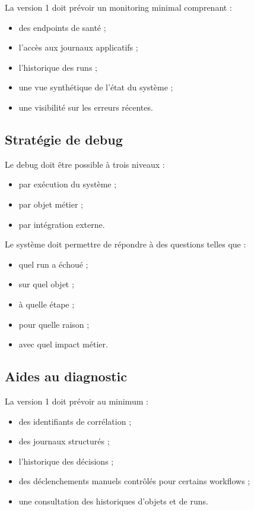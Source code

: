 \documentclass[11pt,a4paper]{article}
\begin{document}
La version 1 doit prévoir un monitoring minimal comprenant :

\begin{itemize}
    \item des endpoints de santé ;
    \item l’accès aux journaux applicatifs ;
    \item l’historique des runs ;
    \item une vue synthétique de l’état du système ;
    \item une visibilité sur les erreurs récentes.
\end{itemize}

\subsection{Stratégie de debug}

Le debug doit être possible à trois niveaux :

\begin{itemize}
    \item par exécution du système ;
    \item par objet métier ;
    \item par intégration externe.
\end{itemize}

Le système doit permettre de répondre à des questions telles que :

\begin{itemize}
    \item quel run a échoué ;
    \item sur quel objet ;
    \item à quelle étape ;
    \item pour quelle raison ;
    \item avec quel impact métier.
\end{itemize}

\subsection{Aides au diagnostic}

La version 1 doit prévoir au minimum :

\begin{itemize}
    \item des identifiants de corrélation ;
    \item des journaux structurés ;
    \item l’historique des décisions ;
    \item des déclenchements manuels contrôlés pour certains workflows ;
    \item une consultation des historiques d’objets et de runs.
\end{itemize}
\end{document}
